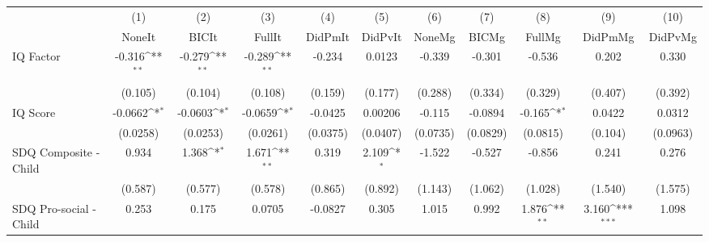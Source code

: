 {
\def\sym#1{\ifmmode^{#1}\else\(^{#1}\)\fi}
\begin{tabular}{l*{10}{c}}
\toprule
            &\multicolumn{1}{c}{(1)}&\multicolumn{1}{c}{(2)}&\multicolumn{1}{c}{(3)}&\multicolumn{1}{c}{(4)}&\multicolumn{1}{c}{(5)}&\multicolumn{1}{c}{(6)}&\multicolumn{1}{c}{(7)}&\multicolumn{1}{c}{(8)}&\multicolumn{1}{c}{(9)}&\multicolumn{1}{c}{(10)}\\
            &\multicolumn{1}{c}{NoneIt}&\multicolumn{1}{c}{BICIt}&\multicolumn{1}{c}{FullIt}&\multicolumn{1}{c}{DidPmIt}&\multicolumn{1}{c}{DidPvIt}&\multicolumn{1}{c}{NoneMg}&\multicolumn{1}{c}{BICMg}&\multicolumn{1}{c}{FullMg}&\multicolumn{1}{c}{DidPmMg}&\multicolumn{1}{c}{DidPvMg}\\
\midrule
IQ Factor   &      -0.316\sym{**} &      -0.279\sym{**} &      -0.289\sym{**} &      -0.234         &      0.0123         &      -0.339         &      -0.301         &      -0.536         &       0.202         &       0.330         \\
            &     (0.105)         &     (0.104)         &     (0.108)         &     (0.159)         &     (0.177)         &     (0.288)         &     (0.334)         &     (0.329)         &     (0.407)         &     (0.392)         \\
\addlinespace
IQ Score    &     -0.0662\sym{*}  &     -0.0603\sym{*}  &     -0.0659\sym{*}  &     -0.0425         &     0.00206         &      -0.115         &     -0.0894         &      -0.165\sym{*}  &      0.0422         &      0.0312         \\
            &    (0.0258)         &    (0.0253)         &    (0.0261)         &    (0.0375)         &    (0.0407)         &    (0.0735)         &    (0.0829)         &    (0.0815)         &     (0.104)         &    (0.0963)         \\
\addlinespace
SDQ Composite - Child&       0.934         &       1.368\sym{*}  &       1.671\sym{**} &       0.319         &       2.109\sym{*}  &      -1.522         &      -0.527         &      -0.856         &       0.241         &       0.276         \\
            &     (0.587)         &     (0.577)         &     (0.578)         &     (0.865)         &     (0.892)         &     (1.143)         &     (1.062)         &     (1.028)         &     (1.540)         &     (1.575)         \\
\addlinespace
SDQ Pro-social - Child&       0.253         &       0.175         &      0.0705         &     -0.0827         &       0.305         &       1.015         &       0.992         &       1.876\sym{**} &       3.160\sym{***}&       1.098         \\

\end{tabular}}
